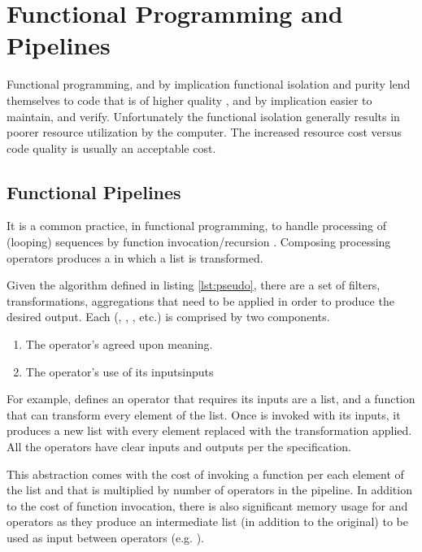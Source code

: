 \section{Functional Programming and Pipelines}
Functional programming, and by implication functional isolation and purity lend themselves to code that is of higher quality \cite{langstudy14}, and by implication easier to maintain, and verify. Unfortunately the functional isolation generally results in poorer resource utilization by the computer. The increased resource cost versus code quality is usually an acceptable cost.

\subsection{Functional Pipelines}
It is a common practice, in functional programming, to handle processing of (looping) sequences by function invocation/recursion \cite{recurse16}.  Composing processing operators produces a \pipeline in which a list is transformed.  

\begin{minipage}{\linewidth}

\end{minipage} 

Given the algorithm defined in listing \ref{lst:pseudo}, there are a set of filters, transformations, aggregations that need to be applied in order to produce the desired output.  Each \pipelineoperator (, , , etc.) is comprised by two components.

\begin{enumerate} 
  \item The operator's agreed upon meaning.  
  \item The operator's use of its inputsinputs
\end{enumerate}

For example,  defines an operator that requires its inputs are a list, and a function that can transform every element of the list.  Once  is invoked with its inputs, it produces a new list with every element replaced with the transformation applied. All the operators have clear inputs and outputs per the \javascript specification. 

This abstraction comes with the cost of invoking a function per each element of the list and that is multiplied by number of operators in the pipeline. In addition to the cost of function invocation, there is also significant memory usage for  and  operators as they produce an intermediate list (in addition to the original) to be used as input between operators (e.g. ).  

